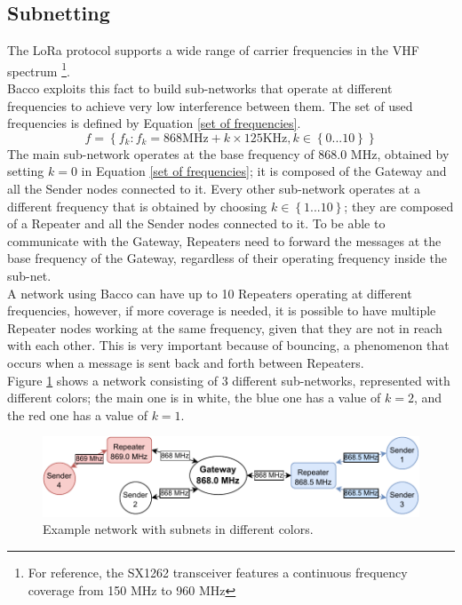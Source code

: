 \subsection{Subnetting}
The LoRa protocol supports a wide range of carrier frequencies in the \gls{VHF} spectrum \footnote{For reference, the
SX1262\cite{sx1262} transceiver features a continuous frequency coverage from 150 MHz to 960 MHz}.\\
Bacco exploits this fact to build sub-networks that operate at different frequencies to achieve very low
interference between them. The set of used frequencies is defined by Equation \ref{set of frequencies}.
\begin{equation}
    \label{set of frequencies}
    f = \left\{ f_k : f_k = 868\text{MHz} + k \times 125\text{KHz}, k\in \left\{0...10 \right\} \right\}
\end{equation}
The main sub-network operates at the base frequency of 868.0 MHz, obtained by setting $k=0$ in Equation \ref{set of
frequencies}; it is composed of the Gateway and all the
Sender nodes connected to it. Every other sub-network operates at a different frequency that is obtained by choosing $k
\in \left\{1...10 \right\}$; they are composed of a Repeater and all the Sender nodes connected to it.
To be able to communicate with the Gateway, Repeaters need to forward the messages at the base frequency of the Gateway,
regardless of their operating frequency inside the sub-net.\\
A network using Bacco can have up to 10 Repeaters operating at different frequencies, however, if more coverage
is needed, it is possible to have multiple Repeater nodes working at the same frequency, given that they are not in
reach with each other. This is very important because of bouncing, a phenomenon that occurs when a message is sent
back and forth between Repeaters.\\
Figure \ref{repeaters subnet} shows a network consisting of 3 different sub-networks, represented with different colors;
the main one is in white, the blue one has a value of $k=2$, and the red one has a value of $k=1$.


\begin{figure}[ht]
    \centering
    \includegraphics[width=\linewidth]{uml/repeaters_subnet.pdf}
    \caption{Example network with subnets in different colors.}
    \label{repeaters subnet}
\end{figure}


